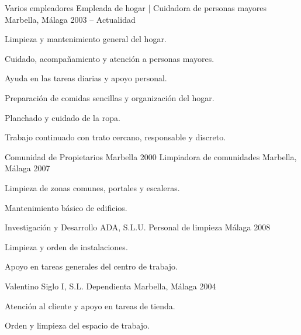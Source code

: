 
\begin{cventries}

    \cventry
    {Varios empleadores}
    {Empleada de hogar | Cuidadora de personas mayores}
    {Marbella, Málaga}
    {2003 -- Actualidad}
    {
    \begin{cvitems}
        \item{Limpieza y mantenimiento general del hogar.}
        \item{Cuidado, acompañamiento y atención a personas mayores.}
        \item{Ayuda en las tareas diarias y apoyo personal.}
        \item{Preparación de comidas sencillas y organización del hogar.}
        \item{Planchado y cuidado de la ropa.}
        \item{Trabajo continuado con trato cercano, responsable y discreto.}
    \end{cvitems}
    }

    \cventry
    {Comunidad de Propietarios Marbella 2000}
    {Limpiadora de comunidades}
    {Marbella, Málaga}
    {2007}
    {
    \begin{cvitems}
        \item{Limpieza de zonas comunes, portales y escaleras.}
        \item{Mantenimiento básico de edificios.}
    \end{cvitems}
    }

    \cventry
    {Investigación y Desarrollo ADA, S.L.U.}
    {Personal de limpieza}
    {Málaga}
    {2008}
    {
    \begin{cvitems}
        \item{Limpieza y orden de instalaciones.}
        \item{Apoyo en tareas generales del centro de trabajo.}
    \end{cvitems}
    }

    \cventry
    {Valentino Siglo I, S.L.}
    {Dependienta}
    {Marbella, Málaga}
    {2004}
    {
    \begin{cvitems}
        \item{Atención al cliente y apoyo en tareas de tienda.}
        \item{Orden y limpieza del espacio de trabajo.}
    \end{cvitems}
    }

\end{cventries}
